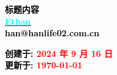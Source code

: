 
\begin{flushright}
    \vspace*{7cm} 
    \Huge\bfseries  
    \textcolor{black}{\textbf{标题内容}}\\[1cm]  %
    \huge\bfseries  
    \href{https://hanlife02.com.cn/}{\textcolor{cyan}{Ethan}}\\[1cm]  %
    \huge\bfseries
    \textcolor{black}{han@hanlife02.com.cn}\\[1cm] %
\end{flushright}

\begin{flushleft}
    \vspace*{7.5cm}
    \large\bfseries
    \textcolor{black}{创建于:}
    \textcolor{red}{2024 年 9 月 16 日}\\[1cm] %
    \large\bfseries 
    \textcolor{black}{更新于:}
    \textcolor{red}{\today}
\end{flushleft}

\newpage

\tableofcontents
\newpage

